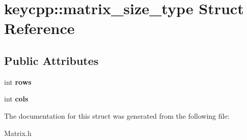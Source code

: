 \hypertarget{structkeycpp_1_1matrix__size__type}{\section{keycpp\-:\-:matrix\-\_\-size\-\_\-type Struct Reference}
\label{structkeycpp_1_1matrix__size__type}
}
\subsection*{Public Attributes}
\begin{DoxyCompactItemize}
\item 
\hypertarget{structkeycpp_1_1matrix__size__type_a85ef26f83d5f0233a675fbfce78928e2}{int {\bfseries rows}}\label{structkeycpp_1_1matrix__size__type_a85ef26f83d5f0233a675fbfce78928e2}

\item 
\hypertarget{structkeycpp_1_1matrix__size__type_af70a3801655b92879104528107a332fb}{int {\bfseries cols}}\label{structkeycpp_1_1matrix__size__type_af70a3801655b92879104528107a332fb}

\end{DoxyCompactItemize}


The documentation for this struct was generated from the following file\-:\begin{DoxyCompactItemize}
\item 
Matrix.\-h\end{DoxyCompactItemize}
